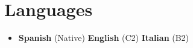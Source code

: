 \documentclass[letterpaper,11pt]{article}
\newcommand{\resumeSubHeadingListStart}{\begin{itemize}[leftmargin=*]}
\newcommand{\resumeSubHeadingListEnd}{\end{itemize}}
\begin{document}
	\section{Languages}
	\resumeSubHeadingListStart
	\item{
		\textbf{Spanish}{ (Native)} \quad
		\textbf{English}{ (C2)} \quad
		\textbf{Italian}{ (B2)}
	}
	\resumeSubHeadingListEnd
	
\end{document}
